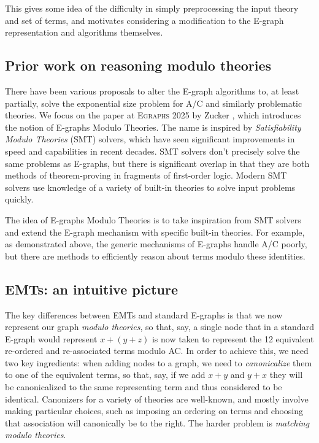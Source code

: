 \documentclass{article}
\theoremstyle{definition}
\begin{document}
This gives some idea of the difficulty in simply preprocessing the input theory and set of terms, and motivates considering a modification to the E-graph representation and algorithms themselves.

\subsection{Prior work on reasoning modulo theories}
There have been various proposals to alter the E-graph algorithms to, at least partially, solve the exponential size problem for A/C and similarly problematic theories. We focus on the paper at \textsc{Egraphs} 2025 by Zucker \cite{zucker2025omelets}, which introduces the notion of E-graphs Modulo Theories. The name is inspired by \emph{Satisfiability Modulo Theories} (SMT) solvers, which have seen significant improvements in speed and capabilities in recent decades. SMT solvers don't precisely solve
the same problems as E-graphs, but there is significant overlap in that they are both methods of theorem-proving in fragments of first-order logic. Modern SMT solvers use knowledge of a variety of built-in theories to solve input problems quickly.

The idea of E-graphs Modulo Theories is to take inspiration from SMT solvers and extend the E-graph mechanism with specific built-in theories. For example, as demonstrated above, the generic mechanisms of E-graphs handle A/C poorly, but there are methods to efficiently reason about terms modulo these identities.

\subsection{EMTs: an intuitive picture}
The key differences between EMTs and standard E-graphs is that we now represent our graph \emph{modulo theories}, so that, say, a single node that in a standard E-graph would represent $x+(y+z)$ is now taken to represent the 12 equivalent re-ordered and re-associated terms modulo AC. In order to achieve this, we need two key ingredients: when adding nodes to a graph, we need to \emph{canonicalize} them to one of the equivalent terms, so that, say, if we add $x+y$ and $y+x$ they will be canonicalized to the same representing term and thus considered to be identical. Canonizers for a variety of theories are well-known, and mostly involve making particular choices, such as imposing an ordering on terms and choosing that association will canonically be to the right. The harder problem is \emph{matching modulo theories}.
\end{document}
